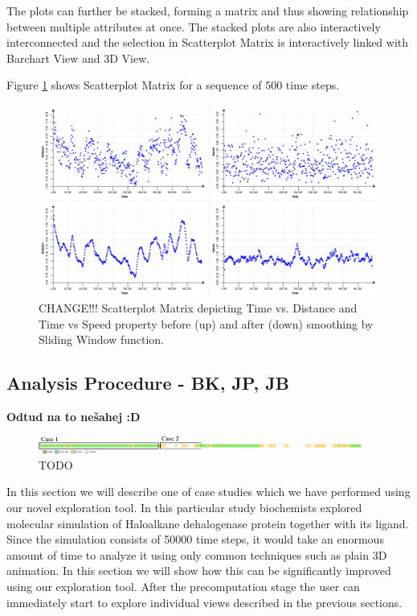 \documentclass[twocolumn]{bmcart}%
\begin{document}
The plots can further be stacked, forming a matrix and thus showing relationship between multiple attributes at once.
The stacked plots are also interactively interconnected and the selection in Scatterplot Matrix is interactively linked with Barchart View and 3D View.

Figure \ref{fig:scatterplot} shows Scatterplot Matrix for a sequence of $500$ time steps.

\begin{figure}[htb]
	\centering
  \includegraphics[width=0.95\linewidth]{img/scatterplot.png}
  \caption{\label{fig:scatterplot} CHANGE!!! Scatterplot Matrix depicting Time vs. Distance and Time vs Speed property before (up) and after (down) smoothing by Sliding Window function.}
\end{figure}

\subsection*{Analysis Procedure - BK, JP, JB}

{\color{red}\textbf{Odtud na to nešahej :D}}

\begin{figure}[htb]
	\centering
  \includegraphics[width=0.95\textwidth]{img/case_overview.pdf}
  \caption{\label{fig:case_overview} {\color{red}TODO}}
\end{figure}

In this section we will describe one of case studies which we have performed using our novel exploration tool.
In this particular study biochemists explored molecular simulation of Haloalkane dehalogenase protein together with its ligand. 
Since the simulation consists of 50000 time steps, it would take an enormous amount of time to analyze it using only common techniques such as plain 3D animation.
In this section we will show how this can be significantly improved using our exploration tool.
After the precomputation stage the user can immediately start to explore individual views described in the previous sections.
\end{document}
